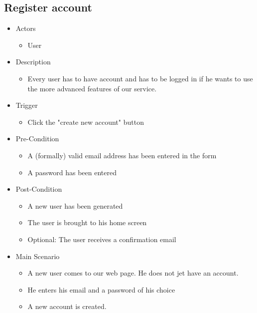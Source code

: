\documentclass[a4paper,11pt]{article}
\begin{document}
\subsection*{Register account}
\begin{itemize}
	\item Actors
		\begin{itemize}
			\item User
		\end{itemize}
	\item Description
		\begin{itemize}
			\item Every user has to have account and has to be logged in if he wants to use the more advanced features of our service.
		\end{itemize}
	\item Trigger
		\begin{itemize}
			\item Click the "create new account" button
		\end{itemize}
	\item Pre-Condition
		\begin{itemize}
			\item A (formally) valid email address has been entered in the form
			\item A password has been entered 
		\end{itemize}
	\item Post-Condition
		\begin{itemize}
			\item A new user has been generated
			\item The user is brought to his home screen
			\item Optional: The user receives a confirmation email
		\end{itemize}
	\item Main Scenario
		\begin{itemize}
			\item A new user comes to our web page. He does not jet have an account.
			\item He enters his email and a password of his choice
			\item A new account is created.
		\end{itemize}
\end{itemize}
\end{document}
